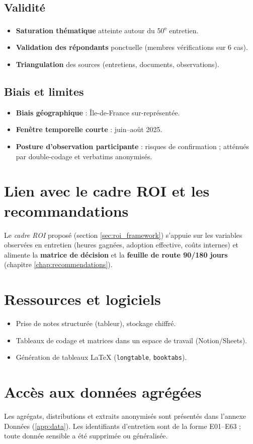 \subsection{Validité}
\begin{itemize}
    \item \textbf{Saturation thématique} atteinte autour du 50\textsuperscript{e} entretien.
    \item \textbf{Validation des répondants} ponctuelle (membres vérifications sur 6 cas).
    \item \textbf{Triangulation} des sources (entretiens, documents, observations).
\end{itemize}

\subsection{Biais et limites}
\begin{itemize}
    \item \textbf{Biais géographique} : Île-de-France sur-représentée.
    \item \textbf{Fenêtre temporelle courte} : juin–août 2025.
    \item \textbf{Posture d'observation participante} : risques de confirmation ; atténués par double-codage et verbatims anonymisés.
\end{itemize}

\section{Lien avec le cadre ROI et les recommandations}
Le \emph{cadre ROI} proposé (section \ref{sec:roi_framework}) s'appuie sur les variables observées en entretien (heures gagnées, adoption effective, coûts internes) et alimente la \textbf{matrice de décision} et la \textbf{feuille de route 90/180 jours} (chapitre \ref{chap:recommendations}).

\section{Ressources et logiciels}
\begin{itemize}
    \item Prise de notes structurée (tableur), stockage chiffré.
    \item Tableaux de codage et matrices dans un espace de travail (Notion/Sheets).
    \item Génération de tableaux \LaTeX{} (\texttt{longtable}, \texttt{booktabs}).
\end{itemize}

\section{Accès aux données agrégées}
Les agrégats, distributions et extraits anonymisés sont présentés dans l'annexe Données (\ref{app:data}). Les identifiants d'entretien sont de la forme E01–E63 ; toute donnée sensible a été supprimée ou généralisée.
